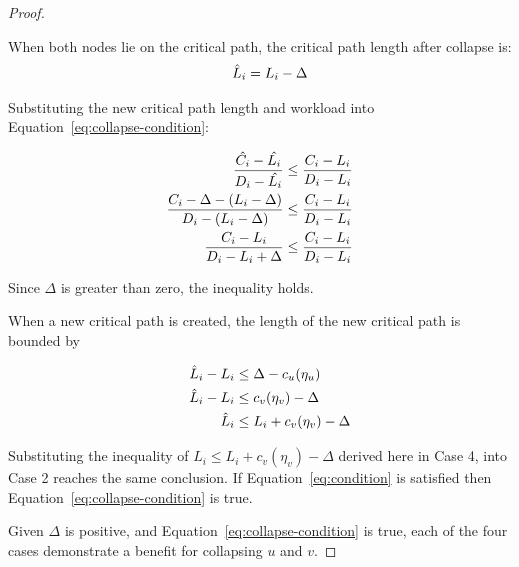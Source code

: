 \begin{theorem}
\begin{proof}
    \begin{case}
      When both nodes lie on the critical path, the critical path
      length after collapse is:
      \begin{align*}
        \indent
        \hat{L}_i = L_i - \Delta
      \end{align*}

      Substituting the new critical path length and workload into
      Equation~\ref{eq:collapse-condition}:

      \begin{align*}
        \indent
        \frac{\hat{C_i} - \hat{L_i}} 
             {D_i - \hat{L_i}} &\le
        \frac{C_i - L_i} 
             {D_i - L_i} \\
        \frac{C_i - \Delta - (L_i - \Delta)}
             {D_i - (L_i - \Delta)}
             &\le
        \frac{C_i - L_i} 
             {D_i - L_i} \\
        \frac{C_i - L_i}
             {D_i - L_i + \Delta}
             &\le
        \frac{C_i - L_i} 
             {D_i - L_i}
      \end{align*}

      Since ${\Delta}$ is greater than zero, the inequality holds.
    \end{case}

    \begin{case}
      When a new critical path is created, the length of the new
      critical path is bounded by

      \begin{align*}
        \indent
        \hat{L}_i - L_i &\le \Delta - c_u(\eta_u) \\
        \hat{L}_i - L_i &\le c_v(\eta_v) - \Delta \\
        \hat{L}_i &\le L_i + c_v(\eta_v) - \Delta \\
      \end{align*}

      Substituting the inequality of
      ${\hat{L}_i \le L_i + c_v(\eta_v) - \Delta}$ derived here in
      Case 4, into Case 2 reaches the same conclusion. If
      Equation~\ref{eq:condition} is satisfied then
      Equation~\ref{eq:collapse-condition} is true.
    \end{case}

    Given ${\Delta}$ is positive, and
    Equation~\ref{eq:collapse-condition} is true, each of the four
    cases demonstrate a benefit for collapsing ${u}$ and ${v}$.
  \end{proof}
\end{theorem}
